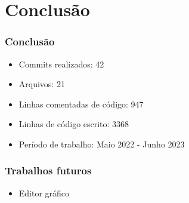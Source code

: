 \documentclass{beamer}
\newcommand{\incsvg}[2]{%
	\def\svgwidth{\columnwidth}
	\graphicspath{{#1}}
	
}
\begin{document}
\section{Conclusão}

\begin{frame}
\frametitle{Conclusão}
\begin{itemize}
	\item Commits realizados: 42
 	\item Arquivos: 21
 	\item Linhas comentadas de código: 947
 	\item Linhas de código escrito: 3368
	\item Período de trabalho: Maio 2022 - Junho 2023
\end{itemize}
\end{frame}

\begin{frame}
\frametitle{Trabalhos futuros}
\begin{itemize}
	\item Editor gráfico
\end{itemize}
\end{frame}


\end{document}
